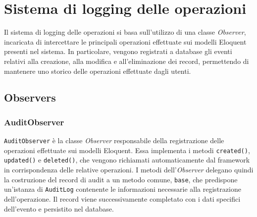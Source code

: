 \section{Sistema di logging delle operazioni}
Il sistema di logging delle operazioni si basa sull'utilizzo di una classe \textit{Observer}, incaricata di intercettare le principali operazioni effettuate sui modelli 
Eloquent presenti nel sistema. In particolare, vengono registrati a database gli eventi relativi alla creazione, alla modifica e all'eliminazione dei record, permettendo 
di mantenere uno storico delle operazioni effettuate dagli utenti.

\subsection{Observers}

\subsubsection*{AuditObserver}
\texttt{AuditObserver} è la classe \textit{Observer} responsabile della registrazione delle operazioni effettuate sui modelli Eloquent. Essa implementa i 
metodi \texttt{created()}, \texttt{updated()} e \texttt{deleted()}, che vengono richiamati automaticamente dal framework in corrispondenza delle relative operazioni.
I metodi dell'\textit{Observer} delegano quindi la costruzione del record di audit a un metodo comune, \texttt{base}, che predispone un'istanza di \texttt{AuditLog} contenente 
le informazioni necessarie alla registrazione dell'operazione. Il record viene successivamente completato con i dati specifici dell'evento e persistito nel database.

